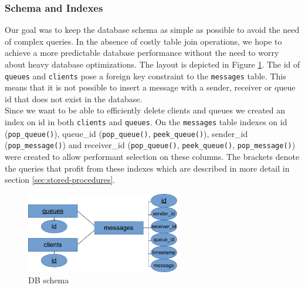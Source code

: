\documentclass[11pt]{article}
\begin{document}
\subsubsection{Schema and Indexes}\label{sec:schema-and-indexes}
Our goal was to keep the database schema as simple as possible to avoid the need of complex queries. In the absence of costly table join operations, we hope to achieve a more predictable database performance without the need to worry about heavy database optimizations. The layout is depicted in Figure \ref{fig:dbschema}. The id of \texttt{queues} and \texttt{clients} pose a foreign key constraint to the \texttt{messages} table. This means that it is not possible to insert a message with a sender, receiver or queue id that does not exist in the database.\\
Since we want to be able to efficiently delete clients and queues we created an index on id in both \texttt{clients} and \texttt{queues}.
On the \texttt{messages} table indexes on id (\texttt{pop\_queue()}), queue\_id (\texttt{pop\_queue()}, \texttt{peek\_queue()}), sender\_id (\texttt{pop\_message()}) and receiver\_id (\texttt{pop\_queue()}, \texttt{peek\_queue()}, \texttt{pop\_message()}) were created to allow performant selection on these columns. The brackets denote the queries that profit from these indexes which are described in more detail in section \ref{sec:stored-procedures}.
\begin{figure}
  \begin{center}
    \includegraphics[width=0.6\textwidth]{figures/dbschema.pdf}
    \caption{DB schema}
    \label{fig:dbschema}
  \end{center}
\end{figure}
\end{document}
